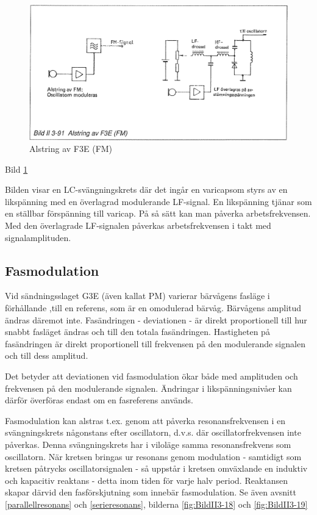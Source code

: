 \begin{figure}
\includegraphics[width=\textwidth]{images/bild_2_3-91}
\caption{Alstring av F3E (FM)}
\label{fig:BildII3-91}
\end{figure}

Bild \ref{fig:BildII3-91}

Bilden visar en LC-svängningskrets där det ingår en varicapsom styrs
av en likspänning med en överlagrad modulerande LF-signal. En
likspänning tjänar som en ställbar förspänning till varicap. På så
sätt kan man påverka arbetsfrekvensen. Med den överlagrade LF-signalen
påverkas arbetsfrekvensen i takt med signalamplituden.

\subsection{Fasmodulation}

Vid sändningsslaget G3E (även kallat PM) varierar bärvågens fasläge i
förhållande ,till en referens, som är en omodulerad bärvåg.  Bärvågens
amplitud ändras däremot inte.  Fasändringen - deviationen - är direkt
proportionell till hur snabbt fasläget ändras och till den totala
fasändringen. Hastigheten på fasändringen är direkt proportionell till
frekvensen på den modulerande signalen och till dess amplitud.

Det betyder att deviationen vid fasmodulation ökar både med amplituden
och frekvensen på den modulerande signalen. Ändringar i
likspänningsnivåer kan därför överföras endast om en fasreferens
används.

Fasmodulation kan alstras t.ex. genom att påverka resonansfrekvensen i
en svängningskrets någonstans efter oscillatorn, d.v.s.  där
oscillatorfrekvensen inte påverkas. Denna svängningskrets har i
viloläge samma resonansfrekvens som oscillatorn. När kretsen bringas
ur resonans genom modulation - samtidigt som kretsen påtrycks
oscillatorsignalen - så uppstår i kretsen omväxlande en induktiv och
kapacitiv reaktans - detta inom tiden för varje halv period. Reaktansen
skapar därvid den fasförskjutning som innebär fasmodulation. Se även
avsnitt \ref{parallellresonans} och \ref{serieresonans}, bilderna
\ref{fig:BildII3-18} och \ref{fig:BildII3-19}

